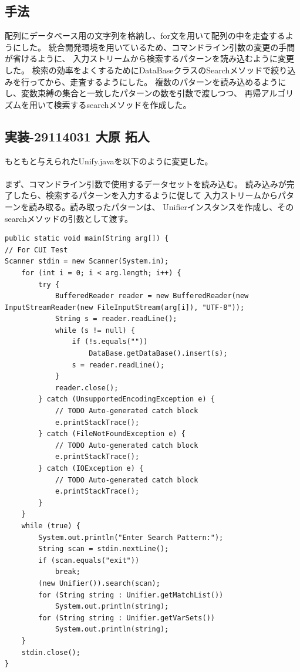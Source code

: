 \documentclass{jarticle}
\begin{document}
\subsection{手法}
    配列にデータベース用の文字列を格納し、for文を用いて配列の中を走査するようにした。
    統合開発環境を用いているため、コマンドライン引数の変更の手間が省けるように、
    入力ストリームから検索するパターンを読み込むように変更した。
    検索の効率をよくするためにDataBaseクラスのSearchメソッドで絞り込みを行ってから、走査するようにした。
    複数のパターンを読み込めるようにし、変数束縛の集合と一致したパターンの数を引数で渡しつつ、
    再帰アルゴリズムを用いて検索するsearchメソッドを作成した。
\subsection{実装-29114031 大原 拓人}
    もともと与えられたUnify.javaを以下のように変更した。
    \paragraph{}
    まず、コマンドライン引数で使用するデータセットを読み込む。
    読み込みが完了したら、検索するパターンを入力するように促して
    入力ストリームからパターンを読み取る。読み取ったパターンは、
    Unifierインスタンスを作成し、そのsearchメソッドの引数として渡す。

\begin{lstlisting}[caption=Unifyクラスより抜粋]
public static void main(String arg[]) {
// For CUI Test
Scanner stdin = new Scanner(System.in);
    for (int i = 0; i < arg.length; i++) {
        try {
            BufferedReader reader = new BufferedReader(new InputStreamReader(new FileInputStream(arg[i]), "UTF-8"));
            String s = reader.readLine();
            while (s != null) {
                if (!s.equals(""))
                    DataBase.getDataBase().insert(s);
                s = reader.readLine();
            }
            reader.close();
        } catch (UnsupportedEncodingException e) {
            // TODO Auto-generated catch block
            e.printStackTrace();
        } catch (FileNotFoundException e) {
            // TODO Auto-generated catch block
            e.printStackTrace();
        } catch (IOException e) {
            // TODO Auto-generated catch block
            e.printStackTrace();
        }
    }
    while (true) {
        System.out.println("Enter Search Pattern:");
        String scan = stdin.nextLine();
        if (scan.equals("exit"))
            break;
        (new Unifier()).search(scan);
        for (String string : Unifier.getMatchList())
            System.out.println(string);
        for (String string : Unifier.getVarSets())
            System.out.println(string);
    }
    stdin.close();
}
\end{lstlisting}
\end{document}
